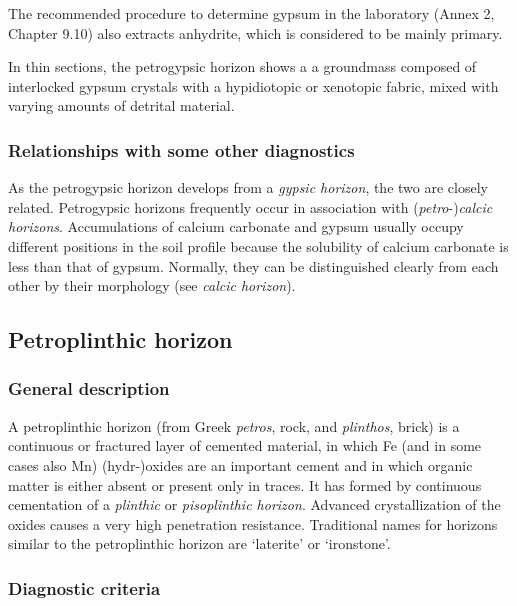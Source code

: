 \documentclass[
  letterpaper,
  DIV=11,
  numbers=noendperiod]{scrreprt}
\begin{document}
The recommended procedure to determine gypsum in the laboratory (Annex
2, Chapter 9.10) also extracts anhydrite, which is considered to be
mainly primary.

In thin sections, the petrogypsic horizon shows a a groundmass composed
of interlocked gypsum crystals with a hypidiotopic or xenotopic fabric,
mixed with varying amounts of detrital material.

\hypertarget{relationships-with-some-other-diagnostics-25}{%
\subsubsection{Relationships with some other
diagnostics}\label{relationships-with-some-other-diagnostics-25}}

As the petrogypsic horizon develops from a \emph{gypsic horizon}, the
two are closely related. Petrogypsic horizons frequently occur in
association with (\emph{petro}-)\emph{calcic horizons}. Accumulations of
calcium carbonate and gypsum usually occupy different positions in the
soil profile because the solubility of calcium carbonate is less than
that of gypsum. Normally, they can be distinguished clearly from each
other by their morphology (see \emph{calcic horizon}).

\hypertarget{petroplinthic-horizon}{%
\subsection{Petroplinthic horizon}\label{petroplinthic-horizon}}

\hypertarget{general-description-26}{%
\subsubsection{General description}\label{general-description-26}}

A petroplinthic horizon (from Greek \emph{petros}, rock, and
\emph{plinthos}, brick) is a continuous or fractured layer of cemented
material, in which Fe (and in some cases also Mn) (hydr-)oxides are an
important cement and in which organic matter is either absent or present
only in traces. It has formed by continuous cementation of a
\emph{plinthic} or \emph{pisoplinthic horizon}. Advanced crystallization
of the oxides causes a very high penetration resistance. Traditional
names for horizons similar to the petroplinthic horizon are `laterite'
or `ironstone'.

\hypertarget{diagnostic-criteria-26}{%
\subsubsection{Diagnostic criteria}\label{diagnostic-criteria-26}}
\end{document}
